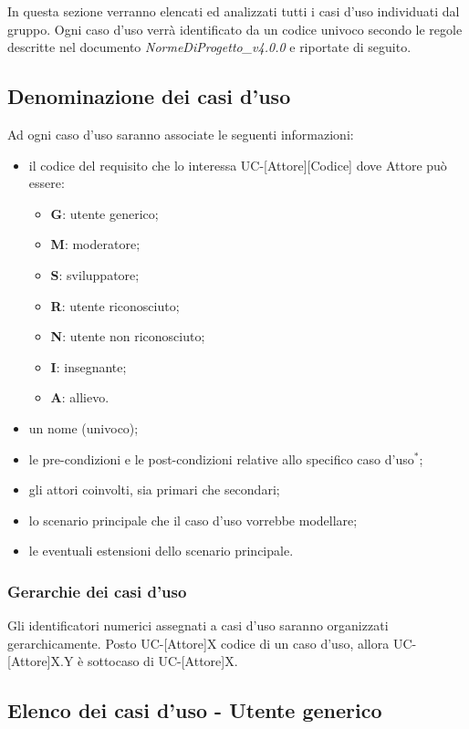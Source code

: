 In questa sezione verranno elencati ed analizzati tutti i casi d'uso individuati dal gruppo. Ogni caso d'uso verrà identificato da un codice univoco secondo le regole descritte nel documento \textit{NormeDiProgetto\_v4.0.0} e riportate di seguito. 

\subsection{Denominazione dei casi d'uso}
Ad ogni caso d'uso saranno associate le seguenti informazioni:
\begin{itemize}
\item il codice del requisito che lo interessa UC-[Attore][Codice] dove Attore può essere:
	\begin{itemize}
		\item \textbf{G}: utente generico;
		\item \textbf{M}: moderatore;
		\item \textbf{S}: sviluppatore;
		\item \textbf{R}: utente riconosciuto;
		\item \textbf{N}: utente non riconosciuto;
		\item \textbf{I}: insegnante;
		\item \textbf{A}: allievo.
	\end{itemize}
\item un nome (univoco);
\item le pre-condizioni e le post-condizioni relative allo specifico caso d'uso$^*$;
\item gli attori coinvolti, sia primari che secondari;
\item lo scenario principale che il caso d'uso vorrebbe modellare;
\item le eventuali estensioni dello scenario principale.
\end{itemize}

\subsubsection{Gerarchie dei casi d'uso} 
Gli identificatori numerici assegnati a casi d'uso saranno organizzati gerarchicamente. Posto UC-[Attore]X codice di un caso d'uso, allora UC-[Attore]X.Y è sottocaso di UC-[Attore]X.

\subsection{Elenco dei casi d'uso - Utente generico}

